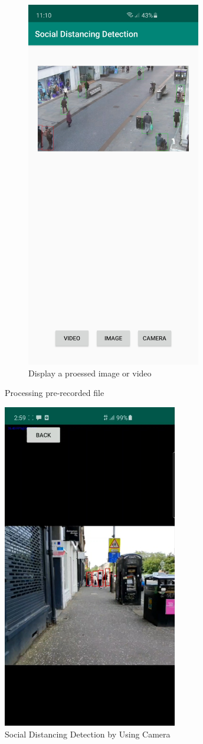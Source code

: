 \begin{figure}[h!]
\begin{subfigure}{.5\textwidth}
        \includegraphics[width=3in]{images/appendix-a/sh-output.jpg}
        \caption{Display a proessed image or video}
        \label{twoDistances}
        \end{subfigure}
        \caption{Processing pre-recorded file}
        \label{appendix:process}
    \end{figure}

    \begin{figure}[!ht]
        \centering
        \includegraphics[width=3in]{images/chapter5/application/camera-detection.jpg}
        \caption{Social Distancing Detection by Using Camera}
        \label{appendix:camera}
    \end{figure}